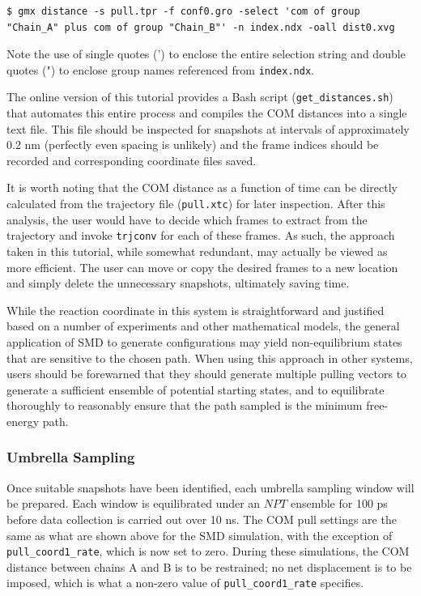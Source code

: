 \documentclass[9pt,tutorial,pubversion]{livecoms}
\begin{document}
\begin{lstlisting}
$ gmx distance -s pull.tpr -f conf0.gro -select 'com of group "Chain_A" plus com of group "Chain_B"' -n index.ndx -oall dist0.xvg
\end{lstlisting}

Note the use of single quotes (') to enclose the entire selection string and double quotes (") to enclose group names referenced from \texttt{index.ndx}.

The online version of this tutorial provides a Bash script (\texttt{get\_distances.sh}) that automates this entire process and compiles the COM distances into a single text file. This file should be inspected for snapshots at intervals of approximately 0.2 nm (perfectly even spacing is unlikely) and the frame indices should be recorded and corresponding coordinate files saved.

It is worth noting that the COM distance as a function of time can be directly calculated from the trajectory file (\texttt{pull.xtc}) for later inspection. After this analysis, the user would have to decide which frames to extract from the trajectory and invoke \texttt{trjconv} for each of these frames. As such, the approach taken in this tutorial, while somewhat redundant, may actually be viewed as more efficient. The user can move or copy the desired frames to a new location and simply delete the unnecessary snapshots, ultimately saving time.

While the reaction coordinate in this system is straightforward and justified based on a number of experiments and other mathematical models, the general application of SMD to generate configurations may yield non-equilibrium states that are sensitive to the chosen path. When using this approach in other systems, users should be forewarned that they should generate multiple pulling vectors to generate a sufficient ensemble of potential starting states, and to equilibrate thoroughly to reasonably ensure that the path sampled is the minimum free-energy path.

\subsubsection{Umbrella Sampling} \label{umbrella_us}

Once suitable snapshots have been identified, each umbrella sampling window will be prepared. Each window is equilibrated under an $NPT$ ensemble for 100 ps before data collection is carried out over 10 ns. The COM pull settings are the same as what are shown above for the SMD simulation, with the exception of \texttt{pull\_coord1\_rate}, which is now set to zero. During these simulations, the COM distance between chains A and B is to be restrained; no net displacement is to be imposed, which is what a non-zero value of \texttt{pull\_coord1\_rate} specifies.
\end{document}
